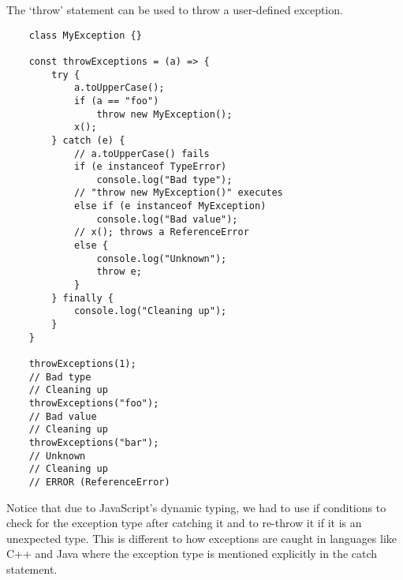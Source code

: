 \documentclass[11pt,a4paper]{article}
\begin{document}
The `throw' statement can be used to throw a user-defined exception.
\begin{verbatim}
    class MyException {}

    const throwExceptions = (a) => {
        try {
            a.toUpperCase();
            if (a == "foo")
                throw new MyException();
            x();
        } catch (e) {
            // a.toUpperCase() fails
            if (e instanceof TypeError)
                console.log("Bad type");
            // "throw new MyException()" executes
            else if (e instanceof MyException)
                console.log("Bad value");
            // x(); throws a ReferenceError
            else {
                console.log("Unknown");
                throw e;
            }
        } finally {
            console.log("Cleaning up");
        }
    }

    throwExceptions(1);
    // Bad type
    // Cleaning up
    throwExceptions("foo");
    // Bad value
    // Cleaning up
    throwExceptions("bar");
    // Unknown
    // Cleaning up
    // ERROR (ReferenceError)
\end{verbatim}
Notice that due to JavaScript's dynamic typing,
we had to use if conditions to check for the exception type after catching it
and to re-throw it if it is an unexpected type.
This is different to how exceptions are caught in languages like C++ and Java
where the exception type is mentioned explicitly in the catch statement.
\end{document}

